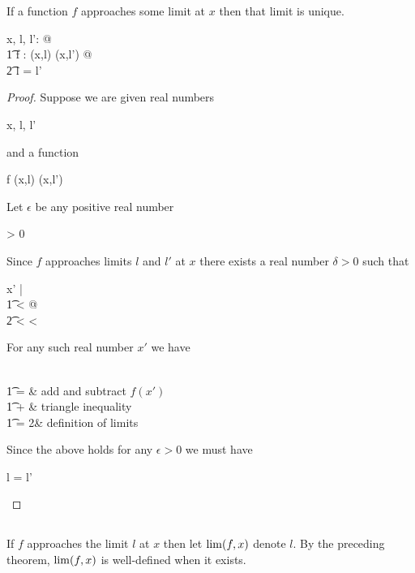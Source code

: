 \documentclass[11pt, oneside]{article}
\begin{document}
\begin{theorem}
If a function $f$ approaches some limit at $x$ then that limit is unique.
\begin{zed}
	\forall x, l, l': \R @ \\
	\t1	\forall f : \limRR(x,l) \cap \limRR(x,l') @ \\
	\t2		l = l'
\end{zed}
\end{theorem}

\begin{proof}
Suppose we are given real numbers
\begin{argue}
	x, l, l' \in \R 
\end{argue}
and a function
\begin{argue}
	f \in \limRR(x,l) \cap \limRR(x,l')
\end{argue}
Let $\epsilon$ be any positive real number
\begin{argue}
	\epsilon > 0
\end{argue}
Since $f$ approaches limits $l$ and $l'$ at $x$ there exists a real number $\delta > 0$ such that
\begin{argue}
	\forall x' \in \R |  \\
	\t1	\zeroR \ltR {}< \delta @ \\
	\t2		  < \epsilon \land {} < \epsilon
\end{argue}
For any such real number $x'$ we have
\begin{argue}
	 \\
	\t1	=  			& add and subtract $f(x')$ \\
	\t1	\leq {} +  	& triangle inequality \\
	\t1	= 2\epsilon					& definition of limits
\end{argue}
Since the above holds for any $\epsilon > 0$ we must have
\begin{argue}
	l = l'
\end{argue}

\end{proof}

\subsection{}

If $f$ approaches the limit $l$ at $x$ then let $\operatorname{lim}(f,x)$ denote $l$.
By the preceding theorem, $\operatorname{lim}(f,x)$ is well-defined when it exists.
\end{document}
